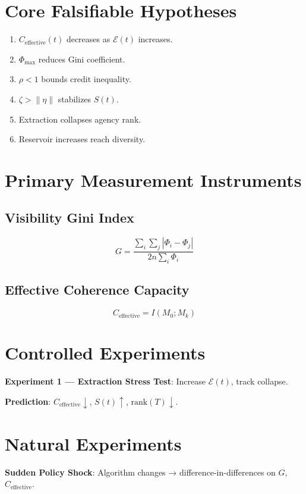 \documentclass[11pt,a4paper]{article}
\theoremstyle{plain}
\theoremstyle{definition}
\theoremstyle{remark}
\begin{document}
\section{Core Falsifiable Hypotheses}

\begin{enumerate}[label=\textbf{H\arabic*.}]
  \item $C_{\text{effective}}(t)$ decreases as $\mathcal{E}(t)$ increases.
  \item $\Phi_{\max}$ reduces Gini coefficient.
  \item $\rho < 1$ bounds credit inequality.
  \item $\zeta > \|\eta\|$ stabilizes $S(t)$.
  \item Extraction collapses agency rank.
  \item Reservoir increases reach diversity.
\end{enumerate}

\section{Primary Measurement Instruments}

\subsection{Visibility Gini Index}
\[
G = \frac{\sum_{i}\sum_{j} |\Phi_i - \Phi_j|}{2 n \sum_i \Phi_i}
\]

\subsection{Effective Coherence Capacity}
\[
C_{\text{effective}} = I(M_0; M_k)
\]

\section{Controlled Experiments}

\textbf{Experiment 1 — Extraction Stress Test}: Increase $\mathcal{E}(t)$, track collapse.

\textbf{Prediction}: $C_{\text{effective}} \downarrow$, $S(t) \uparrow$, $\text{rank}(T) \downarrow$.

\section{Natural Experiments}

\textbf{Sudden Policy Shock}: Algorithm changes → difference-in-differences on $G$, $C_{\text{effective}}$.
\end{document}
